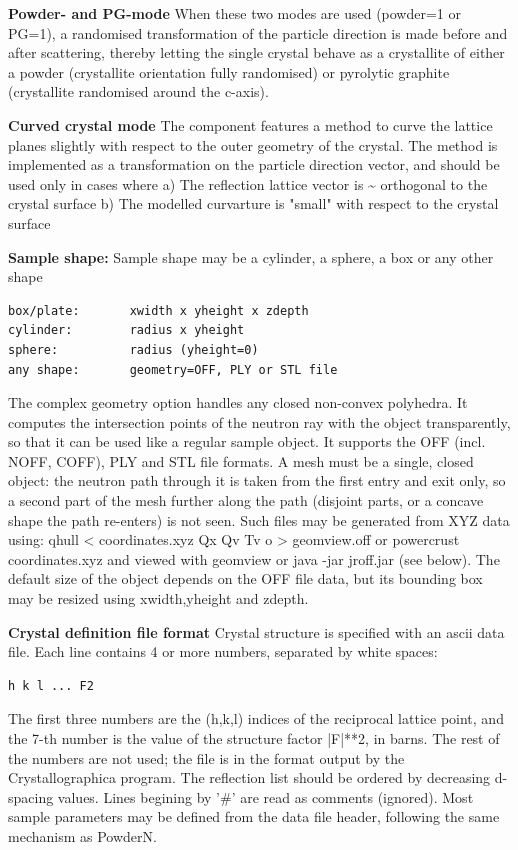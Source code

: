 \textbf{Powder- and PG-mode} When these two modes are used (powder=1 or PG=1), a randomised transformation of the particle direction is made before and after scattering, thereby letting the single crystal behave as a crystallite of either a powder (crystallite orientation fully randomised) or pyrolytic graphite (crystallite randomised around the c-axis).

\textbf{Curved crystal mode} The component features a method to curve the lattice planes slightly with respect to the outer geometry of the crystal. The method is implemented as a transformation on the particle direction vector, and should be used only in cases where a) The reflection lattice vector is \textasciitilde{} orthogonal to the crystal surface b) The modelled curvarture is "small" with respect to the crystal surface

\textbf{Sample shape:} Sample shape may be a cylinder, a sphere, a box or any other shape

\begin{verbatim}
box/plate:       xwidth x yheight x zdepth
cylinder:        radius x yheight
sphere:          radius (yheight=0)
any shape:       geometry=OFF, PLY or STL file
\end{verbatim}

The complex geometry option handles any closed non-convex polyhedra. It computes the intersection points of the neutron ray with the object transparently, so that it can be used like a regular sample object. It supports the OFF (incl. NOFF, COFF), PLY and STL file formats. A mesh must be a single, closed object: the neutron path through it is taken from the first entry and exit only, so a second part of the mesh further along the path (disjoint parts, or a concave shape the path re-enters) is not seen. Such files may be generated from XYZ data using: qhull \textless{} coordinates.xyz Qx Qv Tv o \textgreater{} geomview.off or powercrust coordinates.xyz and viewed with geomview or java -jar jroff.jar (see below). The default size of the object depends on the OFF file data, but its bounding box may be resized using xwidth,yheight and zdepth.

\textbf{Crystal definition file format} Crystal structure is specified with an ascii data file. Each line contains 4 or more numbers, separated by white spaces:

\begin{verbatim}
h k l ... F2
\end{verbatim}

The first three numbers are the (h,k,l) indices of the reciprocal lattice point, and the 7-th number is the value of the structure factor |F|**2, in barns. The rest of the numbers are not used; the file is in the format output by the Crystallographica program. The reflection list should be ordered by decreasing d-spacing values. Lines begining by '\#' are read as comments (ignored). Most sample parameters may be defined from the data file header, following the same mechanism as PowderN.

